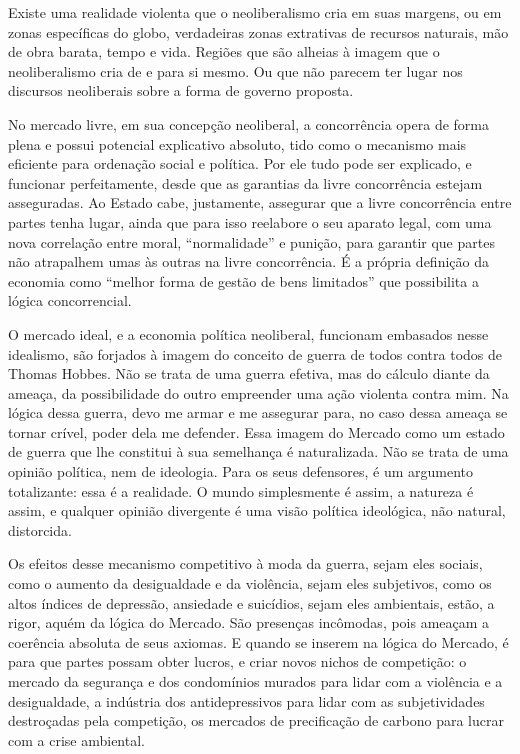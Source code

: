 Existe uma realidade violenta que o neoliberalismo cria em suas margens,
ou em zonas específicas do globo, verdadeiras zonas extrativas de
recursos naturais, mão de obra barata, tempo e vida. Regiões que são
alheias à imagem que o neoliberalismo cria de e para si mesmo. Ou que não
parecem ter lugar nos discursos neoliberais sobre a forma de governo
proposta.

\asterisc

No mercado livre, em sua concepção neoliberal, a concorrência opera de
forma plena e possui potencial explicativo absoluto, tido como o
mecanismo mais eficiente para ordenação social e política. Por ele tudo
pode ser explicado, e funcionar perfeitamente, desde que as garantias da
livre concorrência estejam asseguradas. Ao Estado cabe, justamente,
assegurar que a livre concorrência entre partes tenha lugar, ainda que
para isso reelabore o seu aparato legal, com uma nova
correlação entre moral, ``normalidade'' e punição, para garantir que
partes não atrapalhem umas às outras na livre concorrência. É a própria
definição da economia como ``melhor forma de gestão de bens limitados''
que possibilita a lógica concorrencial.

O mercado ideal, e a economia política neoliberal, funcionam embasados
nesse idealismo, são forjados à imagem do conceito de guerra de todos
contra todos de Thomas Hobbes. Não se trata de uma guerra efetiva, mas
do cálculo diante da ameaça, da possibilidade do outro empreender uma
ação violenta contra mim. Na lógica dessa guerra, devo me armar e me
assegurar para, no caso dessa ameaça se tornar crível, poder dela me
defender. Essa imagem do Mercado como um estado de guerra que lhe
constitui à sua semelhança é naturalizada. Não se trata de uma opinião
política, nem de ideologia. Para os seus defensores, é um argumento
totalizante: essa é a realidade. O mundo simplesmente é assim, a
natureza é assim, e qualquer opinião divergente é uma visão política
ideológica, não natural, distorcida.

Os efeitos desse mecanismo competitivo à moda da guerra, sejam eles
sociais, como o aumento da desigualdade e da violência, sejam eles
subjetivos, como os altos índices de depressão, ansiedade e suicídios,
sejam eles ambientais, estão, a rigor, aquém da lógica do Mercado. São
presenças incômodas, pois ameaçam a coerência absoluta de seus axiomas.
E quando se inserem na lógica do Mercado, é para que partes possam obter
lucros, e criar novos nichos de competição: o mercado da segurança e dos
condomínios murados para lidar com a violência e a desigualdade, a
indústria dos antidepressivos para lidar com as subjetividades
destroçadas pela competição, os mercados de precificação de carbono para
lucrar com a crise ambiental.

